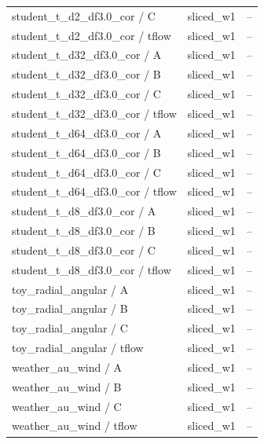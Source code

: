 \begin{tabular}{lll}
student\_t\_d2\_df3.0\_cor / C & sliced\_w1 & -- \\
student\_t\_d2\_df3.0\_cor / tflow & sliced\_w1 & -- \\
student\_t\_d32\_df3.0\_cor / A & sliced\_w1 & -- \\
student\_t\_d32\_df3.0\_cor / B & sliced\_w1 & -- \\
student\_t\_d32\_df3.0\_cor / C & sliced\_w1 & -- \\
student\_t\_d32\_df3.0\_cor / tflow & sliced\_w1 & -- \\
student\_t\_d64\_df3.0\_cor / A & sliced\_w1 & -- \\
student\_t\_d64\_df3.0\_cor / B & sliced\_w1 & -- \\
student\_t\_d64\_df3.0\_cor / C & sliced\_w1 & -- \\
student\_t\_d64\_df3.0\_cor / tflow & sliced\_w1 & -- \\
student\_t\_d8\_df3.0\_cor / A & sliced\_w1 & -- \\
student\_t\_d8\_df3.0\_cor / B & sliced\_w1 & -- \\
student\_t\_d8\_df3.0\_cor / C & sliced\_w1 & -- \\
student\_t\_d8\_df3.0\_cor / tflow & sliced\_w1 & -- \\
toy\_radial\_angular / A & sliced\_w1 & -- \\
toy\_radial\_angular / B & sliced\_w1 & -- \\
toy\_radial\_angular / C & sliced\_w1 & -- \\
toy\_radial\_angular / tflow & sliced\_w1 & -- \\
weather\_au\_wind / A & sliced\_w1 & -- \\
weather\_au\_wind / B & sliced\_w1 & -- \\
weather\_au\_wind / C & sliced\_w1 & -- \\
weather\_au\_wind / tflow & sliced\_w1 & -- \\
\bottomrule
\end{tabular}

